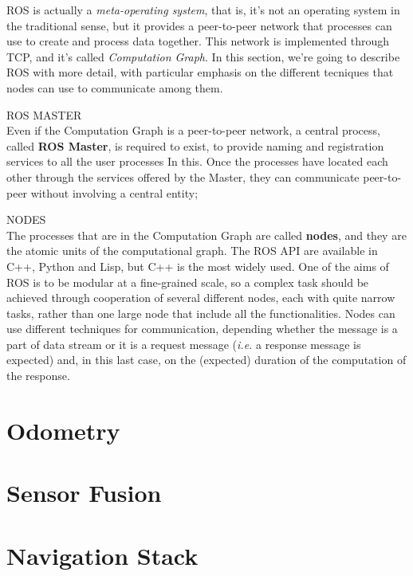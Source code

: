 \ac{ROS} is actually a \textit{meta-operating system}, that is, it's not an operating system in the traditional sense, but it provides a peer-to-peer network that processes can use to create and process data together. This network is implemented through TCP, and it's called \textit{Computation Graph}. In this section, we're going to describe \ac{ROS} with more detail, with particular emphasis on the different tecniques that nodes can use to communicate among them.
\begin{description}
\item{ROS MASTER} \\
Even if the Computation Graph is a peer-to-peer network, a central process, called  \textbf{\ac{ROS} Master}, is required to exist, to provide naming and registration services to all the user processes In this. Once the processes have located each other through the services offered by the Master, they can communicate peer-to-peer without involving a central entity;

\item{NODES} \\
The processes that are in the Computation Graph are called \textbf{nodes}, and they are the atomic units of the computational graph. The \ac{ROS} API are available in C++, Python and Lisp, but C++ is the most widely used. One of the aims of \ac{ROS} is to be modular at a fine-grained scale, so a complex task should be achieved through cooperation of several different nodes, each with quite narrow tasks, rather than one large node that include all the functionalities. Nodes can use different techniques for communication, depending whether the message is a part of data stream or it is a request message (\textit{i.e.} a response message is expected) and, in this last case, on the (expected) duration of the computation of the response.

\end{description}
\section{Odometry}\label{sec:odometry}

\section{Sensor Fusion}\label{sec:sensorFusion}

\section{Navigation Stack}\label{sec:navigationStack}